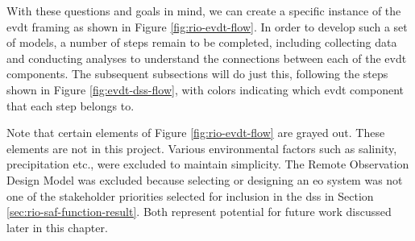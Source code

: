 %

With these questions and goals in mind, we can create a specific instance of the \ac{evdt} framing as shown in Figure \ref{fig:rio-evdt-flow}. In order to develop such a set of models, a number of steps remain to be completed, including collecting data and conducting analyses to understand the connections between each of the \ac{evdt} components. The subsequent subsections will do just this, following the steps shown in Figure \ref{fig:evdt-dss-flow}, with colors indicating which \ac{evdt} component that each step belongs to. 

Note that certain elements of Figure \ref{fig:rio-evdt-flow} are grayed out. These elements are not in this project. Various environmental factors such as salinity, precipitation etc., were excluded to maintain simplicity. The Remote Observation Design Model was excluded because selecting or designing an \ac{eo} system was not one of the stakeholder priorities selected for inclusion in the \ac{dss} in Section \ref{sec:rio-saf-function-result}. Both represent potential for future work discussed later in this chapter.

